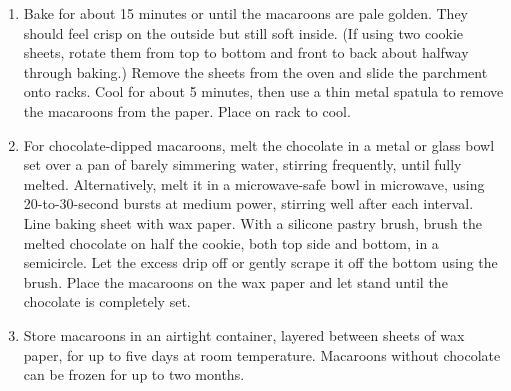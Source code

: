 \documentclass[11pt, twoside, openany]{book}
\begin{document}
\begin{minipage}[t]{\linewidth}
\begin{enumerate}
\item Bake for about 15 minutes or until the macaroons are pale golden. They should feel crisp on the outside but still soft inside. (If using two cookie sheets, rotate them from top to bottom and front to back about halfway through baking.) Remove the sheets from the oven and slide the parchment onto racks. Cool for about 5 minutes, then use a thin metal spatula to remove the macaroons from the paper. Place on rack to cool.
\item For chocolate-dipped macaroons, melt the chocolate in a metal or glass bowl set over a pan of barely simmering water, stirring frequently, until fully melted. Alternatively, melt it in a microwave-safe bowl in microwave, using 20-to-30-second bursts at medium power, stirring well after each interval. Line baking sheet with wax paper. With a silicone pastry brush, brush the melted chocolate on half the cookie, both top side and bottom, in a semicircle. Let the excess drip off or gently scrape it off the bottom using the brush. Place the macaroons on the wax paper and let stand until the chocolate is completely set.
\item Store macaroons in an airtight container, layered between sheets of wax paper, for up to five days at room temperature. Macaroons without chocolate can be frozen for up to two months.
\end{enumerate}
\end{minipage}\vspace{8mm}
\end{document}
